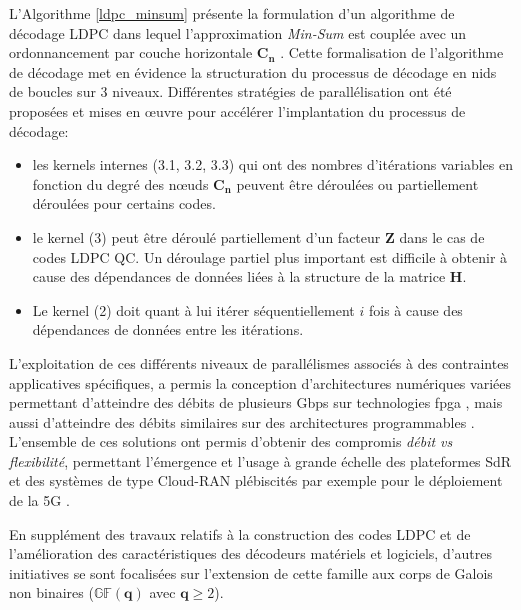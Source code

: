 \documentclass[../main.tex]{subfiles}
\begin{document}
L’Algorithme \ref{ldpc_minsum} présente la formulation d’un algorithme de décodage LDPC dans lequel l’approximation \textit{Min-Sum} est couplée avec un ordonnancement par couche horizontale $\bm{C_n}$ \cite{LDPC:HL}. Cette formalisation de l’algorithme de décodage met en évidence la structuration du processus de décodage en nids de boucles sur 3 niveaux. Différentes stratégies de parallélisation ont été proposées et mises en œuvre pour accélérer l’implantation du processus de décodage:
\begin{itemize}
    \item les kernels internes (3.1, 3.2, 3.3) qui ont des nombres d'itérations variables en fonction du degré des nœuds $\bm{C_n}$ peuvent être déroulées ou partiellement déroulées pour certains codes.
    \item le kernel (3) peut être déroulé partiellement d’un facteur \textbf{Z} dans le cas de codes LDPC QC. Un déroulage partiel plus important est difficile à obtenir à cause des dépendances de données liées à la structure de la matrice \textbf{H}.
    \item Le kernel (2) doit quant à lui itérer séquentiellement $\mathit{i}$ fois à cause des dépendances de données entre les itérations. 
\end{itemize}

L'exploitation de ces différents niveaux de parallélismes associés à des contraintes applicatives spécifiques, a permis la conception d’architectures numériques variées permettant d’atteindre des débits de plusieurs Gbps sur technologies \acrshort{fpga} \cite{PIGNOLY:MS,BOUTILLON}, mais aussi d’atteindre des débits similaires sur des architectures programmables \cite{BLG:REVUE:TPDS,FAIR:LDPC}. \\
L’ensemble de ces solutions ont permis d'obtenir des compromis \textit{débit vs flexibilité}, permettant l’émergence et l’usage à grande échelle des plateformes SdR \cite{SDR, SURVEY:SDR} et des systèmes de type Cloud-RAN \cite{CLOUD:RAN2,CLOUD:RAN3} plébiscités par exemple pour le déploiement de la 5G \cite{CLOUD:RAN1}. 

En supplément des travaux relatifs à la construction des codes LDPC et de l’amélioration des caractéristiques des décodeurs matériels et logiciels, d’autres initiatives se sont focalisées sur l’extension de cette famille aux corps de Galois non binaires ($\mathbb{GF}( \bm{q} )$ avec $\bm{q}\ge2$).

% 
% 
% 
% 
\end{document}
